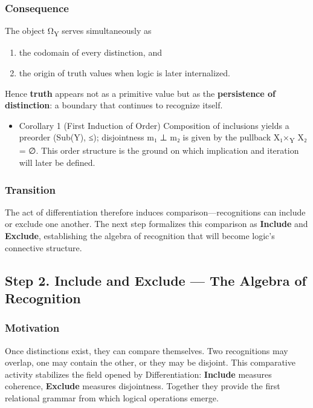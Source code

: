 \documentclass[11pt]{article}
\begin{document}
\subsubsection*{Consequence}
\label{sec:orgf1efae4}
The object Ω\textsubscript{Y} serves simultaneously as  
\begin{enumerate}
\item the codomain of every distinction, and
\item the origin of truth values when logic is later internalized.
\end{enumerate}

Hence \textbf{truth} appears not as a primitive value but as the \textbf{persistence of distinction}: a boundary that continues to recognize itself.
\begin{itemize}
\item Corollary 1 (First Induction of Order)
\label{sec:org6614333}
Composition of inclusions yields a preorder (Sub(Y), ≤); disjointness m₁ ⊥ m₂ is given by the pullback X₁×\textsubscript{Y} X₂ = ∅.  
This order structure is the ground on which implication and iteration will later be defined.
\end{itemize}
\subsubsection*{Transition}
\label{sec:orgfbd82df}
The act of differentiation therefore induces comparison—recognitions can include or exclude one another.  
The next step formalizes this comparison as \textbf{Include} and \textbf{Exclude}, establishing the algebra of recognition that will become logic’s connective structure.
\subsection*{Step 2. Include and Exclude — The Algebra of Recognition}
\label{sec:org8e4ed62}

\subsubsection*{Motivation}
\label{sec:org46193b7}
Once distinctions exist, they can compare themselves.  
Two recognitions may overlap, one may contain the other, or they may be disjoint.  
This comparative activity stabilizes the field opened by Differentiation:  
\textbf{Include} measures coherence, \textbf{Exclude} measures disjointness.  
Together they provide the first relational grammar from which logical operations emerge.
\end{document}
